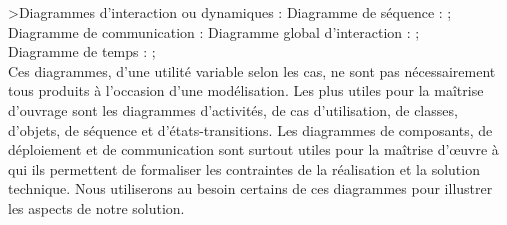 \textgreater Diagrammes d’interaction ou dynamiques :
\textbullet Diagramme de séquence : ; \\
\textbullet Diagramme de communication : 
\textbullet Diagramme global d'interaction : ; \\
\textbullet Diagramme de temps : ; \\
Ces diagrammes, d'une utilité variable selon les cas, ne sont pas nécessairement tous produits à l'occasion d'une modélisation. Les plus utiles pour la maîtrise d'ouvrage sont les diagrammes d'activités, de cas d'utilisation, de classes, d'objets, de séquence et d'états-transitions. Les diagrammes de composants, de déploiement et de communication sont surtout utiles pour la maîtrise d'œuvre à qui ils permettent de formaliser les contraintes de la réalisation et la solution technique.
Nous utiliserons au besoin certains de ces diagrammes pour illustrer les aspects de notre solution.

\clearpage 

